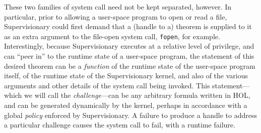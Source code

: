 \documentclass[a4paper, UKenglish, cleveref, autoref, thm-restate, colorlinks]{lipics-v2021}
\begin{document}
These two families of system call need not be kept separated, however.
In particular, prior to allowing a user-space program to open or read a file, Supervisionary could first demand that a (handle to a) theorem is supplied to it as an extra argument to the file-open system call, \texttt{fopen}, for example.
Interestingly, because Supervisionary executes at a relative level of privilege, and can ``peer in'' to the runtime state of a user-space program, the statement of this desired theorem can be a \emph{function} of the runtime state of the user-space program itself, of the runtime state of the Supervisionary kernel, and also of the various arguments and other details of the system call being invoked.
This statement---which we will call the \emph{challenge}---can be any arbitrary formula written in HOL, and can be generated dynamically by the kernel, perhaps in accordance with a global \emph{policy} enforced by Supervisionary.
A failure to produce a handle to address a particular challenge causes the system call to fail, with a runtime failure.
\end{document}
